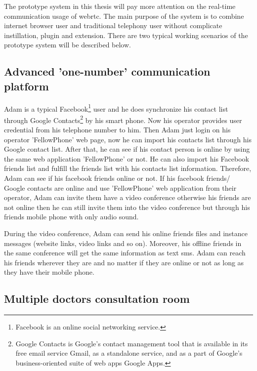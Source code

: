 \noindent The prototype system in this thesis will pay more attention on the real-time communication usage of \gls{webrtc}. The main purpose of the system is to combine internet browser user and traditional telephony user without complicate instillation, plugin and extension. There are two typical working scenarios of the prototype system will be described below.

\subsection{Advanced 'one-number' communication platform}

\par Adam is a typical Facebook\footnote{Facebook is an online social networking service.} user and he does synchronize his contact list through Google Contacts\footnote{Google Contacts is Google's contact management tool that is available in its free email service Gmail, as a standalone service, and as a part of Google's business-oriented suite of web apps Google Apps.\cite{wiki:google_contacts}} by his smart phone. Now his operator provides user credential from his telephone number to him. Then Adam just login on his operator 'FellowPhone' web page, now he can import his contacts list through his Google contact list. After that, he can see if his contact person is online by using the same web application 'FellowPhone' or not. He can also import his Facebook friends list and fulfill the friends list with his contacts list information. Therefore, Adam can see if his facebook friends online or not. If his facebook friends/ Google contacts are online and use 'FellowPhone' web application from their operator, Adam can invite them have a video conference otherwise his friends are not online then he can still invite them into the video conference but through his friends mobile phone with only audio sound.

\par During the video conference, Adam can send his online friends files and instance messages (website links, video links and so on). Moreover, his offline friends in the same conference will get the same information as text \gls{sms}. Adam can reach his friends wherever they are and no matter if they are online or not as long as they have their mobile phone. 

\subsection{Multiple doctors consultation room}

